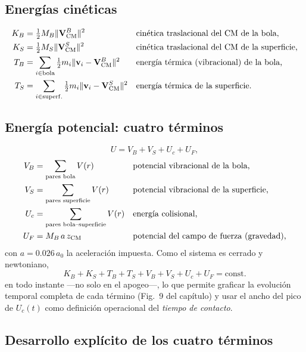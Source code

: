 \documentclass[11pt,a4paper]{article}
\begin{document}
\subsection{Energías cinéticas}

\begin{align}
K_B &= \tfrac12 M_B\|\mathbf V_{\rm CM}^B\|^2
    &&\text{cinética traslacional del CM de la bola,}
    \label{eq:2012_KB}\\
K_S &= \tfrac12 M_S\|\mathbf V_{\rm CM}^S\|^2
    &&\text{cinética traslacional del CM de la superficie,}
    \label{eq:2012_KS}\\
T_B &= \sum_{i\in{\rm bola}} \tfrac12 m_i\|\mathbf v_i-\mathbf V_{\rm CM}^B\|^2
    &&\text{energía térmica (vibracional) de la bola,}
    \label{eq:2012_TB}\\
T_S &= \sum_{i\in{\rm superf.}} \tfrac12 m_i\|\mathbf v_i-\mathbf V_{\rm CM}^S\|^2
    &&\text{energía térmica de la superficie.}
    \label{eq:2012_TS}
\end{align}

\subsection{Energía potencial: cuatro términos}

\begin{equation}
U = V_B + V_S + U_c + U_F,
\label{eq:2012_U}
\end{equation}
\begin{align}
V_B &= \sum_{\text{pares bola}} V(r) &&\text{potencial vibracional de la bola,}
    \label{eq:2012_VB}\\
V_S &= \sum_{\text{pares superficie}} V(r) &&\text{potencial vibracional de la superficie,}
    \label{eq:2012_VS}\\
U_c &= \sum_{\text{pares bola--superficie}} V(r) &&\text{energía colisional,}
    \label{eq:2012_Uc}\\
U_F &= M_B\,a\,z_{\rm CM} &&\text{potencial del campo de fuerza (gravedad),}
    \label{eq:2012_UF}
\end{align}
con $a=0.026\,a_0$ la aceleración impuesta. Como el sistema es cerrado y
newtoniano,
\[
K_B+K_S+T_B+T_S+V_B+V_S+U_c+U_F = \text{const.}
\]
en todo instante ---no solo en el apogeo---, lo que permite graficar la
evolución temporal completa de cada término (Fig.~9 del capítulo) y usar
el ancho del pico de $U_c(t)$ como definición operacional del
\emph{tiempo de contacto}.

\subsection{Desarrollo explícito de los cuatro términos}
\label{sec:desarrollo_2012}
\end{document}
